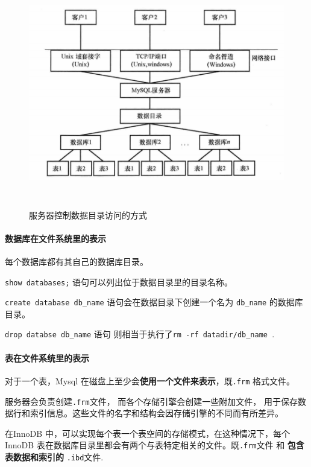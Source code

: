 \documentclass[UTF8,a4paper,12pt]{ctexbook}
\begin{document}
				\begin{figure}[H]
					\centering
					\includegraphics[width=15cm,height=10cm]{datadir}
					\caption{服务器控制数据目录访问的方式}
				\end{figure}
			
			\paragraph{数据库在文件系统里的表示}
				每个数据库都有其自己的数据库目录。
				
				\verb|show databases;| 语句可以列出位于数据目录里的目录名称。
				
				\verb|create database db_name| 语句会在数据目录下创建一个名为 \verb|db_name| 的数据库目录。
			
				\verb|drop databse db_name| 语句 则相当于执行了\verb|rm -rf datadir/db_name |.
				
			\paragraph{表在文件系统里的表示}
				对于一个表，Mysql 在磁盘上至少会\textbf{使用一个文件来表示}，既\verb|.frm| 格式文件。
				
				服务器会负责创建\verb|.frm|文件， 而各个存储引擎会创建一些附加文件， 用于保存数据行和索引信息。这些文件的名字和结构会因存储引擎的不同而有所差异。
				
				在InnoDB 中，可以实现每个表一个表空间的存储模式，在这种情况下，每个InnoDB 表在数据库目录里都会有两个与表特定相关的文件。既\verb|.frm|文件 和 \textbf{包含表数据和索引的} \verb|.ibd|文件. 
				
\end{document}
